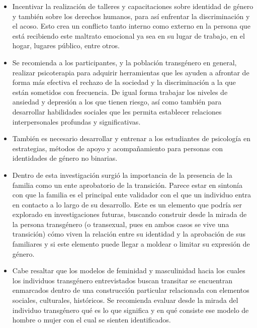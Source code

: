 \begin{itemize}
\item Incentivar la realización de talleres y capacitaciones sobre identidad de
género y también sobre los derechos humanos, para así enfrentar la
discriminación y el acoso. Esto crea un conflicto tanto interno como externo en
la persona que está recibiendo este maltrato emocional ya sea en su lugar de
trabajo, en el hogar, lugares público, entre otros.

\item Se recomienda a los participantes, y la población transgénero en general,
realizar psicoterapia para adquirir herramientas que les ayuden a afrontar de
forma más efectiva el rechazo de la sociedad y la discriminación a la que están
sometidos con frecuencia. De igual forma trabajar los niveles de ansiedad y
depresión a los que tienen riesgo, así como también para desarrollar habilidades
sociales que les permita establecer relaciones interpersonales profundas y
significativas.

\item También es necesario desarrollar y entrenar a los estudiantes de
psicología en estrategias, métodos de apoyo y acompañamiento para personas con
identidades de género no binarias.

\item Dentro de esta investigación surgió la importancia de la presencia de la
familia como un ente aprobatorio de la transición. Parece estar en sintonía con
que la familia es el principal ente validador con el que un
individuo entra en contacto a lo largo de su desarrollo. Este es un elemento que
podría ser explorado en investigaciones futuras, buscando construir desde la
mirada de la persona transgénero (o transexual, pues en ambos casos se vive una
transición) cómo viven la relación entre su identidad y la aprobación de sus
familiares y si este elemento puede llegar a moldear o limitar su expresión de
género.

\item Cabe resaltar que los modelos de feminidad y masculinidad hacia los cuales
los individuos transgénero entrevistados buscan transitar se encuentran
enmarcados dentro de una construcción particular relacionada con elementos
sociales, culturales, históricos. Se recomienda evaluar desde la mirada del
individuo transgénero qué es lo que significa y en qué consiste ese modelo de
hombre o mujer con el cual se sienten identificados.
\end{itemize}
